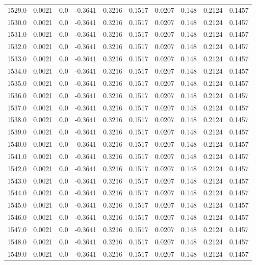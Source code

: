 \begin{longtable}{lrrrrrrrrr}
1529.0 & 0.0021 & 0.0 & -0.3641 & 0.3216 & 0.1517 & 0.0207 & 0.148 & 0.2124 & 0.1457 \\
1530.0 & 0.0021 & 0.0 & -0.3641 & 0.3216 & 0.1517 & 0.0207 & 0.148 & 0.2124 & 0.1457 \\
1531.0 & 0.0021 & 0.0 & -0.3641 & 0.3216 & 0.1517 & 0.0207 & 0.148 & 0.2124 & 0.1457 \\
1532.0 & 0.0021 & 0.0 & -0.3641 & 0.3216 & 0.1517 & 0.0207 & 0.148 & 0.2124 & 0.1457 \\
1533.0 & 0.0021 & 0.0 & -0.3641 & 0.3216 & 0.1517 & 0.0207 & 0.148 & 0.2124 & 0.1457 \\
1534.0 & 0.0021 & 0.0 & -0.3641 & 0.3216 & 0.1517 & 0.0207 & 0.148 & 0.2124 & 0.1457 \\
1535.0 & 0.0021 & 0.0 & -0.3641 & 0.3216 & 0.1517 & 0.0207 & 0.148 & 0.2124 & 0.1457 \\
1536.0 & 0.0021 & 0.0 & -0.3641 & 0.3216 & 0.1517 & 0.0207 & 0.148 & 0.2124 & 0.1457 \\
1537.0 & 0.0021 & 0.0 & -0.3641 & 0.3216 & 0.1517 & 0.0207 & 0.148 & 0.2124 & 0.1457 \\
1538.0 & 0.0021 & 0.0 & -0.3641 & 0.3216 & 0.1517 & 0.0207 & 0.148 & 0.2124 & 0.1457 \\
1539.0 & 0.0021 & 0.0 & -0.3641 & 0.3216 & 0.1517 & 0.0207 & 0.148 & 0.2124 & 0.1457 \\
1540.0 & 0.0021 & 0.0 & -0.3641 & 0.3216 & 0.1517 & 0.0207 & 0.148 & 0.2124 & 0.1457 \\
1541.0 & 0.0021 & 0.0 & -0.3641 & 0.3216 & 0.1517 & 0.0207 & 0.148 & 0.2124 & 0.1457 \\
1542.0 & 0.0021 & 0.0 & -0.3641 & 0.3216 & 0.1517 & 0.0207 & 0.148 & 0.2124 & 0.1457 \\
1543.0 & 0.0021 & 0.0 & -0.3641 & 0.3216 & 0.1517 & 0.0207 & 0.148 & 0.2124 & 0.1457 \\
1544.0 & 0.0021 & 0.0 & -0.3641 & 0.3216 & 0.1517 & 0.0207 & 0.148 & 0.2124 & 0.1457 \\
1545.0 & 0.0021 & 0.0 & -0.3641 & 0.3216 & 0.1517 & 0.0207 & 0.148 & 0.2124 & 0.1457 \\
1546.0 & 0.0021 & 0.0 & -0.3641 & 0.3216 & 0.1517 & 0.0207 & 0.148 & 0.2124 & 0.1457 \\
1547.0 & 0.0021 & 0.0 & -0.3641 & 0.3216 & 0.1517 & 0.0207 & 0.148 & 0.2124 & 0.1457 \\
1548.0 & 0.0021 & 0.0 & -0.3641 & 0.3216 & 0.1517 & 0.0207 & 0.148 & 0.2124 & 0.1457 \\
1549.0 & 0.0021 & 0.0 & -0.3641 & 0.3216 & 0.1517 & 0.0207 & 0.148 & 0.2124 & 0.1457 \\

\end{longtable}
